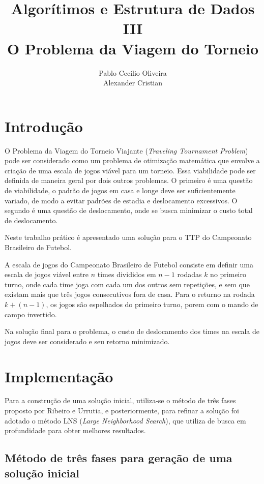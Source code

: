 \documentclass[12pt,a4paper]{article}
\author{Pablo Cecilio Oliveira\\
	Alexander Cristian}
\title{Algorítimos e Estrutura de Dados III\\
O Problema da Viagem do Torneio}
\date{}
\numberwithin{figure}{section}
\numberwithin{table}{section}
\begin{document}
\maketitle

\section{Introdução}

O Problema da Viagem do Torneio Viajante (\textit{Traveling Tournament Problem}) pode ser considerado como um problema de otimização matemática que envolve a criação de uma escala de jogos viável para um torneio. Essa viabilidade pode ser definida de maneira geral por dois outros problemas. O primeiro é uma questão de viabilidade, o padrão de jogos em casa e longe deve ser suficientemente variado, de modo a evitar padrões de estadia e deslocamento excessivos. O segundo é uma questão de deslocamento, onde se busca minimizar o custo total de deslocamento.

Neste trabalho prático é apresentado uma solução para o TTP do Campeonato Brasileiro de Futebol.

A escala de jogos do Campeonato Brasileiro de Futebol consiste em definir uma escala de jogos viável entre $n$ times divididos em $n-1$ rodadas $k$ no primeiro turno, onde cada time joga com cada um dos outros sem repetições, e sem que existam mais que três jogos consecutivos fora de casa. Para o returno na rodada $k + (n - 1)$, os jogos são espelhados do primeiro turno, porem com o mando de campo invertido.

Na solução final para o problema, o custo de deslocamento dos times na escala de jogos deve ser considerado e seu retorno minimizado.

\section{Implementação}

Para a construção de uma solução inicial, utiliza-se o método de três fases proposto por Ribeiro e Urrutia\cite{urrutia:heuristics}, e posteriormente, para refinar a solução foi adotado o método LNS (\textit{Large Neighborhood Search}), que utiliza de busca em profundidade para obter melhores resultados.

\subsection{Método de três fases para geração de uma solução inicial}
\end{document}
